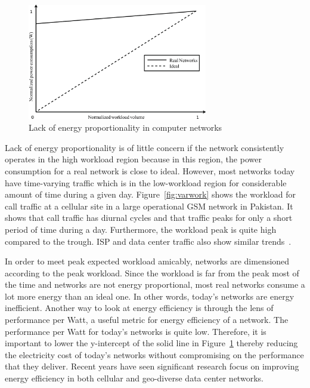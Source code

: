 \begin{figure}
\centering
\includegraphics[width=0.7\textwidth]{pics/enerprop.eps}
\caption{Lack of energy proportionality in computer networks}
\label{fig:ener-prop}
\end{figure} 

Lack of energy proportionality is of little concern if the network consistently operates in the high workload region because in this region, the power consumption for a real network is close to ideal. However, most networks today have time-varying traffic which is in the low-workload region for considerable amount of time during a given day. Figure~\ref{fig:varwork} shows the workload for call traffic at a cellular site in a large operational GSM network in Pakistan. It shows that call traffic has diurnal cycles and that traffic peaks for only a short period of time during a day. Furthermore, the workload peak is quite high compared to the trough. ISP and data center traffic also show similar trends~\cite{1248656,10.1109/MC.2007.443}. 

In order to meet peak expected workload amicably, networks are dimensioned according to the peak workload. Since the workload is far from the peak most of the time and networks are not energy proportional, most real networks consume a lot more energy than an ideal one. In other words, today's networks are energy inefficient. Another way to look at energy efficiency is through the lens of performance per Watt, a useful metric for energy efficiency of a network. The performance per Watt for today's networks is quite low. Therefore, it is important to lower the y-intercept of the solid line in Figure~\ref{fig:ener-prop} thereby reducing the electricity cost of today's networks without compromising on the performance that they deliver. Recent years have seen significant research focus on improving energy efficiency in both cellular and geo-diverse data center networks.

